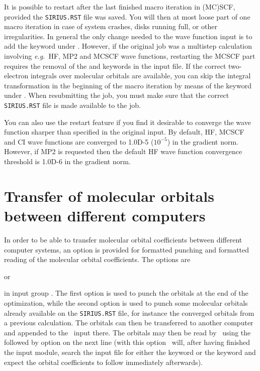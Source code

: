 It is possible to restart after the last finished
macro iteration in (MC)SCF, provided the \verb|SIRIUS.RST|
file was saved.  You will then at most
loose part of one macro iteration in case of system crashes, disks
running full, or other irregularities. \noindent In general the
only change needed to the wave function input is to add the
 keyword under . However, if the
original job was a multistep calculation involving {\it e.g.}~HF,
MP2 and MCSCF wave functions, restarting the MCSCF part requires the
removal of the  and  keywords in the input
file. If the correct
two-electron integrals over molecular orbitals are available, you
can skip the integral transformation 
in the beginning of the macro iteration by means
of the  keyword under
. When resubmitting the job, you must make
sure that the correct \verb|SIRIUS.RST| file is
made available to the job.

\noindent
You can also use the restart feature if you find it desirable to
converge the wave function sharper
than specified in the original input. By default, HF, MCSCF
and CI wave functions are converged to 1.0D-5 ($10^{-5}$) in the gradient norm.
However, if MP2 is requested then the default HF wave function convergence threshold is 1.0D-6 in the gradient norm.

\pagebreak[2]
\section{\label{sec:ig_orbtransfer}
Transfer of molecular orbitals between different computers}

In order to be able to transfer molecular orbital coefficients between
different computer systems,
an option is provided for
formatted punching and formatted reading of the molecular orbital
coefficients.  The options are
\begin{center}
    or 
\end{center}
in input group . The first option is used to
punch the orbitals at the end of the optimization, while the
second option is used to punch some molecular
orbitals already available on the \verb|SIRIUS.RST|
file, for instance the converged
orbitals from a previous calculation.  The orbitals can then be
transferred to another computer and appended to the \sirius\  input
there. The orbitals may then be read by \dalton\ using the 
followed by  option on the next line (with this option
\dalton\ will, after having finished the 
input module, search the input file for either the 
keyword or the  keyword and expect the orbital
coefficients to follow immediately afterwards).


